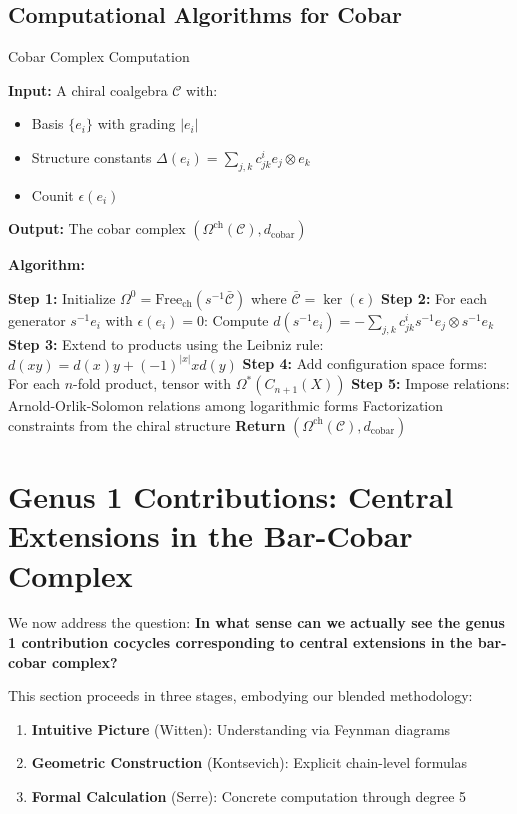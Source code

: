 \subsection{Computational Algorithms for Cobar}

\begin{algorithm}[htbp]
\caption{Cobar Complex Computation}
\textbf{Input:} A chiral coalgebra $\mathcal{C}$ with:
\begin{itemize}
\item Basis $\{e_i\}$ with grading $|e_i|$
\item Structure constants $\Delta(e_i) = \sum_{j,k} c_{jk}^i e_j \otimes e_k$
\item Counit $\epsilon(e_i)$
\end{itemize}

\textbf{Output:} The cobar complex $(\Omega^{\text{ch}}(\mathcal{C}), d_{\text{cobar}})$

\textbf{Algorithm:}
\begin{algorithmic}
\State \textbf{Step 1:} Initialize $\Omega^0 = \text{Free}_{\text{ch}}(s^{-1}\bar{\mathcal{C}})$ where $\bar{\mathcal{C}} = \ker(\epsilon)$
\State \textbf{Step 2:} For each generator $s^{-1}e_i$ with $\epsilon(e_i) = 0$:
\State \quad Compute $d(s^{-1}e_i) = -\sum_{j,k} c_{jk}^i s^{-1}e_j \otimes s^{-1}e_k$
\State \textbf{Step 3:} Extend to products using the Leibniz rule:
\State \quad $d(xy) = d(x)y + (-1)^{|x|}xd(y)$
\State \textbf{Step 4:} Add configuration space forms:
\State \quad For each $n$-fold product, tensor with $\Omega^*(C_{n+1}(X))$
\State \textbf{Step 5:} Impose relations:
\State \quad Arnold-Orlik-Solomon relations among logarithmic forms
\State \quad Factorization constraints from the chiral structure
\State \textbf{Return} $(\Omega^{\text{ch}}(\mathcal{C}), d_{\text{cobar}})$
\end{algorithmic}
\end{algorithm}

\section{Genus 1 Contributions: Central Extensions in the Bar-Cobar Complex}
\label{sec:genus_1_central_extensions}

We now address the question: \textbf{In what sense can we actually see the genus 1
contribution cocycles corresponding to central extensions in the bar-cobar complex?}

This section proceeds in three stages, embodying our blended methodology:
\begin{enumerate}
\item \textbf{Intuitive Picture} (Witten): Understanding via Feynman diagrams
\item \textbf{Geometric Construction} (Kontsevich): Explicit chain-level formulas
\item \textbf{Formal Calculation} (Serre): Concrete computation through degree 5
\end{enumerate}

